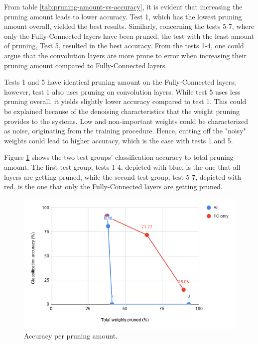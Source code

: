 From table \ref{tab:pruning-amount-vs-accuracy}, it is evident that increasing the pruning amount leads to lower accuracy. Test 1, which has the lowest pruning amount overall, yielded the best results. Similarly, concerning the tests 5-7, where only the Fully-Connected layers have been pruned, the test with the least amount of pruning, Test 5, resulted in the best accuracy. From the tests 1-4, one could argue that the convolution layers are more prone to error when increasing their pruning amount compared to Fully-Connected layers.

Tests 1 and 5 have identical pruning amount on the Fully-Connected layers; however, test 1 also uses pruning on convolution layers. While test 5 uses less pruning overall, it yields slightly lower accuracy compared to test 1. This could be explained because of the denoising characteristics that the weight pruning provides to the systems. Low and non-important weights could be characterized as noise, originating from the training procedure. Hence, cutting off the "noisy" weights could lead to higher accuracy, which is the case with tests 1 and 5.

Figure \ref{fig:pruning-amount-vs-accuracy} shows the two test groups' classification accuracy to total pruning amount. The first test group, tests 1-4, depicted with blue, is the one that all layers are getting pruned, while the second test group, test 5-7, depicted with red, is the one that only the Fully-Connected layers are getting pruned.

\begin{figure} [H]
	\centering
	\includegraphics[width=\textwidth]{Images/Weights-distributions/pruned/pruning-amount-vs-accuracy-chart.png}
	\decoRule
	\caption[Accuracy per pruning amount]{Accuracy per pruning amount.}
	\label{fig:pruning-amount-vs-accuracy}
\end{figure}

